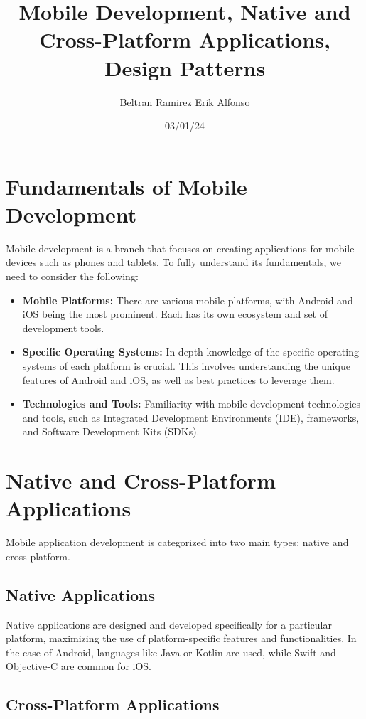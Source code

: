 \documentclass{article}
\title{Mobile Development, Native and Cross-Platform Applications, Design Patterns}
\author{Beltran Ramirez Erik Alfonso}
\date{03/01/24}
\begin{document}
\maketitle

\section{Fundamentals of Mobile Development}

Mobile development is a branch that focuses on creating applications for mobile devices such as phones and tablets. To fully understand its fundamentals, we need to consider the following:

\begin{itemize}[label=--]
    \item \textbf{Mobile Platforms:} There are various mobile platforms, with Android and iOS being the most prominent. Each has its own ecosystem and set of development tools.
    \item \textbf{Specific Operating Systems:} In-depth knowledge of the specific operating systems of each platform is crucial. This involves understanding the unique features of Android and iOS, as well as best practices to leverage them.
    \item \textbf{Technologies and Tools:} Familiarity with mobile development technologies and tools, such as Integrated Development Environments (IDE), frameworks, and Software Development Kits (SDKs).
\end{itemize}

\section{Native and Cross-Platform Applications}

Mobile application development is categorized into two main types: native and cross-platform.

\subsection{Native Applications}

Native applications are designed and developed specifically for a particular platform, maximizing the use of platform-specific features and functionalities. In the case of Android, languages like Java or Kotlin are used, while Swift and Objective-C are common for iOS.

\subsection{Cross-Platform Applications}
\end{document}
